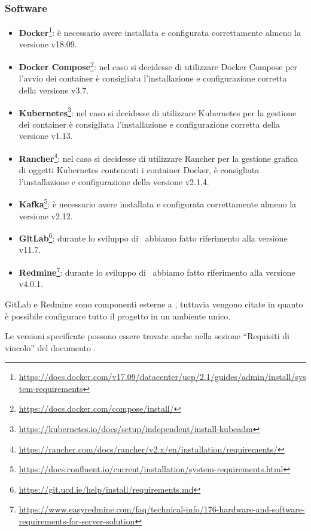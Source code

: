 	\subsubsection{Software}
		\begin{itemize}
			\item \textbf{Docker}\footnote{\url{https://docs.docker.com/v17.09/datacenter/ucp/2.1/guides/admin/install/system-requirements}}: è necessario avere installata e configurata correttamente almeno la versione v18.09.
			\item \textbf{Docker Compose}\footnote{\url{https://docs.docker.com/compose/install/}}:  nel caso si decidesse di utilizzare Docker Compose per l'avvio dei container è consigliata l'installazione e configurazione corretta della versione v3.7.
			\item \textbf{Kubernetes}\footnote{\url{https://kubernetes.io/docs/setup/independent/install-kubeadm}}: nel caso si decidesse di utilizzare Kubernetes per la gestione dei container è consigliata l'installazione e configurazione corretta della versione v1.13.
			\item \textbf{Rancher}\footnote{\url{https://rancher.com/docs/rancher/v2.x/en/installation/requirements/}}: nel caso si decidesse di utilizzare Rancher per la gestione grafica di oggetti Kubernetes contenenti i container Docker, è consigliata l'installazione e configurazione della versione v2.1.4.
			\item \textbf{Kafka}\footnote{\url{https://docs.confluent.io/current/installation/system-requirements.html}}: è necessario avere installata e configurata correttamente almeno la versione v2.12.
			\item \textbf{GitLab}\footnote{\url{https://git.ucd.ie/help/install/requirements.md}}: durante lo sviluppo di \progetto~abbiamo fatto riferimento alla versione v11.7.
			\item \textbf{Redmine}\footnote{%
			\url{https://www.easyredmine.com/faq/technical-info/176-hardware-and-software-requirements-for-server-solution}}: durante lo sviluppo di \progetto~abbiamo fatto riferimento alla versione v4.0.1.
		\end{itemize}

	GitLab e Redmine sono componenti esterne a \progetto, tuttavia vengono citate in quanto è possibile configurare tutto il progetto in un ambiente unico.\par
	Le versioni specificate possono essere trovate anche nella sezione ``Requisiti di vincolo'' del documento \AdRd.

